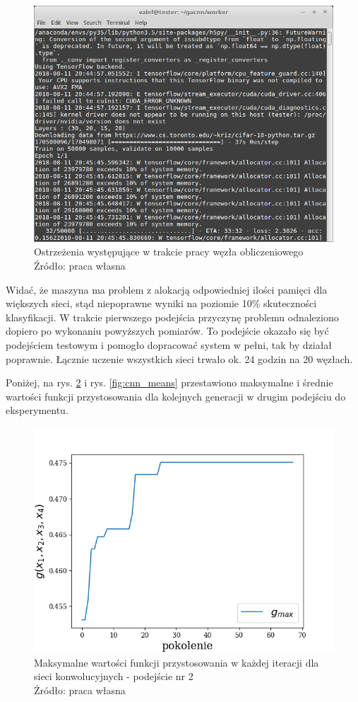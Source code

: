 \begin{figure}[h!tb]
	 \centering
	 \includegraphics[width = 0.9\linewidth]{img/warnings}
	 \caption{Ostrzeżenia występujące w trakcie pracy węzła obliczeniowego  \\
              Źródło: praca własna}
	 \label{fig:warnings}
\end{figure}

Widać, że maszyna ma problem z alokacją odpowiedniej ilości pamięci dla większych sieci, stąd niepoprawne wyniki na poziomie 10\% skuteczności klasyfikacji.
W trakcie pierwszego podejścia przyczynę problemu odnaleziono dopiero po wykonaniu powyższych pomiarów.
To podejście okazało się być podejściem testowym i pomogło dopracować system w pełni, tak by działał poprawnie.
Łącznie uczenie wszystkich sieci trwało ok. 24 godzin na 20 węzłach.

Poniżej, na rys. \ref{fig:cnn_maxes} i rys. \ref{fig:cnn_means} przestawiono maksymalne i średnie wartości funkcji przystosowania dla kolejnych generacji w drugim podejściu do eksperymentu.
\begin{figure}[h!tb]
	 \centering
	 \includegraphics[width = 0.9\linewidth]{img/cnn_maxes}
	 \caption{Maksymalne wartości funkcji przystosowania w każdej iteracji dla sieci konwolucyjnych - podejście nr 2\\
              Źródło: praca własna}
	 \label{fig:cnn_maxes}
\end{figure}

